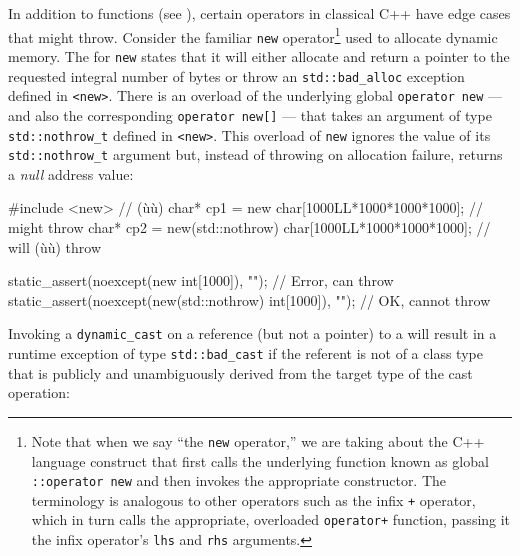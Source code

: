 In addition to functions (see ), certain operators in classical C++ have
edge cases that might throw. Consider the familiar \lstinline!new!
operator{\cprotect\footnote{Note that when we say ``the \lstinline!new!
operator,'' we are taking about the C++ language construct that first
calls the underlying function known as global
\lstinline!::operator!~\lstinline!new! and then invokes the appropriate
constructor. The terminology is analogous to other operators such as
the infix \lstinline!+! operator, which in turn calls the appropriate,
overloaded \lstinline!operator+! function, passing it the infix
  operator's \lstinline!lhs! and \lstinline!rhs! arguments.}} used to allocate
dynamic memory. The  for \lstinline!new! states that it
will either allocate and return a pointer to the requested integral
number of bytes or throw an \lstinline!std::bad_alloc! exception defined
in \lstinline!<new>!. There is an overload of the underlying global
\lstinline!operator!~\lstinline!new! --- and also the corresponding
\lstinline!operator!~\lstinline!new[]! --- that takes an argument of type
\lstinline!std::nothrow_t! defined in \lstinline!<new>!. This overload of
\lstinline!new! ignores the value of its \lstinline!std::nothrow_t! argument
but, instead of throwing on allocation failure, returns a \emph{null}
address value:

\begin{emcppslisting}
#include <new>  // (ù{}ù)
char* cp1 = new               char[1000LL*1000*1000*1000];  // might throw
char* cp2 = new(std::nothrow) char[1000LL*1000*1000*1000];  // will (ù{}ù) throw

static_assert(noexcept(new               int[1000]), "");   // Error, can throw
static_assert(noexcept(new(std::nothrow) int[1000]), "");   // OK, cannot throw
\end{emcppslisting}
    

\noindent Invoking a \lstinline!dynamic_cast! on a reference (but not a pointer) to
a  will result in a runtime exception of type
\lstinline!std::bad_cast! if the referent is not of a class type that is
publicly and unambiguously derived from the target type of the cast
operation:

